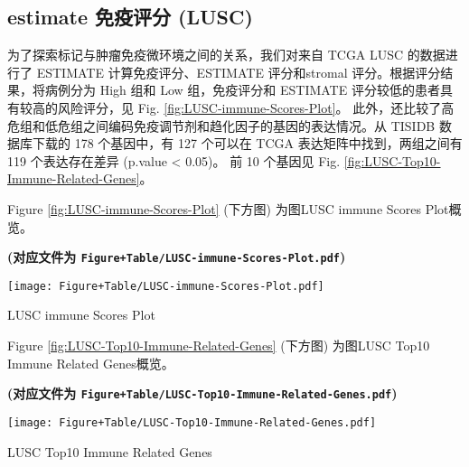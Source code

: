 \documentclass[
]{article}
\begin{document}
\hypertarget{estimate-ux514dux75abux8bc4ux5206-lusc}{%
\subsection{estimate 免疫评分 (LUSC)}\label{estimate-ux514dux75abux8bc4ux5206-lusc}}

为了探索标记与肿瘤免疫微环境之间的关系，我们对来自 TCGA LUSC 的数据进行了 ESTIMATE 计算免疫评分、ESTIMATE 评分和stromal 评分。根据评分结果，将病例分为 High 组和 Low 组，免疫评分和 ESTIMATE 评分较低的患者具有较高的风险评分，见 Fig. \ref{fig:LUSC-immune-Scores-Plot}。
此外，还比较了高危组和低危组之间编码免疫调节剂和趋化因子的基因的表达情况。从 TISIDB 数据库下载的 178 个基因中，有 127 个可以在 TCGA 表达矩阵中找到，两组之间有 119 个表达存在差异 (p.value \textless{} 0.05)。
前 10 个基因见 Fig. \ref{fig:LUSC-Top10-Immune-Related-Genes}。

\begin{center}\vspace{1.5cm}\end{center}

Figure \ref{fig:LUSC-immune-Scores-Plot} (下方图) 为图LUSC immune Scores Plot概览。

\textbf{(对应文件为 \texttt{Figure+Table/LUSC-immune-Scores-Plot.pdf})}

\def\@captype{figure}
\begin{center}
\texttt{[image: Figure+Table/LUSC-immune-Scores-Plot.pdf]}
\caption{LUSC immune Scores Plot}\label{fig:LUSC-immune-Scores-Plot}
\end{center}

\begin{center}\vspace{1.5cm}\end{center}

\begin{center}\vspace{1.5cm}\end{center}

Figure \ref{fig:LUSC-Top10-Immune-Related-Genes} (下方图) 为图LUSC Top10 Immune Related Genes概览。

\textbf{(对应文件为 \texttt{Figure+Table/LUSC-Top10-Immune-Related-Genes.pdf})}

\def\@captype{figure}
\begin{center}
\texttt{[image: Figure+Table/LUSC-Top10-Immune-Related-Genes.pdf]}
\caption{LUSC Top10 Immune Related Genes}\label{fig:LUSC-Top10-Immune-Related-Genes}
\end{center}
\end{document}
